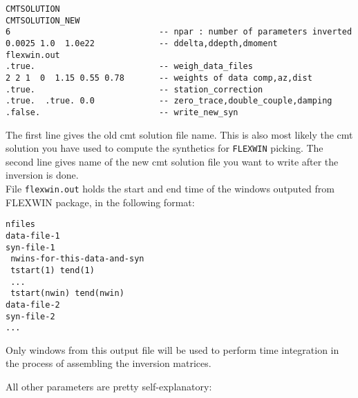\documentclass[12pt,titlepage,fleqn]{article}
\begin{document}
\begin{verbatim}
CMTSOLUTION
CMTSOLUTION_NEW
6                              -- npar : number of parameters inverted
0.0025 1.0  1.0e22             -- ddelta,ddepth,dmoment
flexwin.out
.true.                         -- weigh_data_files
2 2 1  0  1.15 0.55 0.78       -- weights of data comp,az,dist
.true.                         -- station_correction
.true.  .true. 0.0             -- zero_trace,double_couple,damping
.false.                        -- write_new_syn
\end{verbatim}
The first line gives the old cmt solution file name. This is also most likely the cmt solution you have used to compute the synthetics for \verb=FLEXWIN= picking. The second line gives name of the new cmt solution file you want to write after the inversion is done.\\
File \verb=flexwin.out= holds the start and end time of the windows outputed from FLEXWIN package, in the following format:

\begin{verbatim}
nfiles
data-file-1
syn-file-1
 nwins-for-this-data-and-syn
 tstart(1) tend(1)
 ...
 tstart(nwin) tend(nwin)
data-file-2
syn-file-2
...
\end{verbatim}
Only windows from this output file will be used to perform time integration in the process of assembling the inversion matrices.

All other parameters are pretty self-explanatory:
\end{document}

